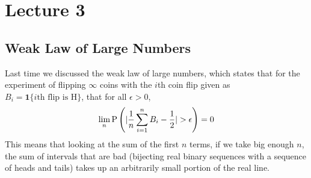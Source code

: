 \section{Lecture 3}
\subsection{Weak Law of Large Numbers}
Last time we discussed the weak law of large numbers, which states that for the experiment
of flipping $\infty$ coins with the $i$th coin flip given as $B_i = \mathbf{1}\{i\text{th flip is H}\}$, that for all $\epsilon > 0$,
\[ \lim_n \P{|\frac{1}{n} \sum_{i = 1}^n B_i - \frac12 | > \epsilon} = 0 \]
This means that looking at the sum of the first $n$ terms, if we take big enough $n$, the sum of intervals
that are bad (bijecting real binary sequences with a sequence of heads and tails) takes up an arbitrarily small portion of the real line.

